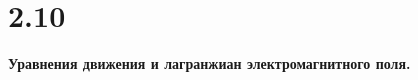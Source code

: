 \documentclass[a4paper,14pt]{article}
\begin{document}
\section*{2.10}
\begin{center}
	\LARGE{\textbf{Уравнения движения и лагранжиан электромагнитного поля.}}
\end{center}
\end{document}
